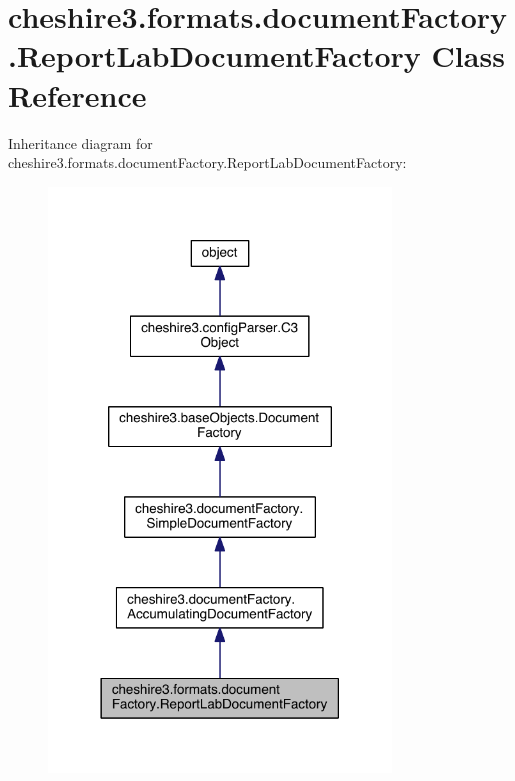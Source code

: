 \hypertarget{classcheshire3_1_1formats_1_1document_factory_1_1_report_lab_document_factory}{\section{cheshire3.\-formats.\-document\-Factory.\-Report\-Lab\-Document\-Factory Class Reference}
\label{classcheshire3_1_1formats_1_1document_factory_1_1_report_lab_document_factory}
}


Inheritance diagram for cheshire3.\-formats.\-document\-Factory.\-Report\-Lab\-Document\-Factory\-:
\nopagebreak
\begin{figure}[H]
\begin{center}
\leavevmode
\includegraphics[width=258pt]{classcheshire3_1_1formats_1_1document_factory_1_1_report_lab_document_factory__inherit__graph}
\end{center}
\end{figure}


